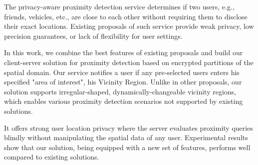 The privacy-aware proximity detection service determines if two
users, e.g., friends, vehicles, etc., are close to each other
without requiring them to disclose their exact locations. Existing proposals of such
service provide weak privacy, low precision guarantees, or lack of flexibility
for user settings. 

In this work, we combine the best features of existing proposals
and build our client-server solution for proximity detection based on encrypted
partitions of the spatial domain. Our service notifies a user if any
pre-selected users enters his specified "area of interest", his Vicinity
Region. Unlike in other proposals, our solution supports irregular-shaped,
dynamically-changeable vicinity regions, which enables various proximity
detection scenarios not supported by existing solutions.

It offers strong user location privacy where the server evaluates
proximity queries blindly without manipulating the spatial data
of any user. Experimental results show that our solution, being
equipped with a new set of features, performs well compared to
existing solutions.